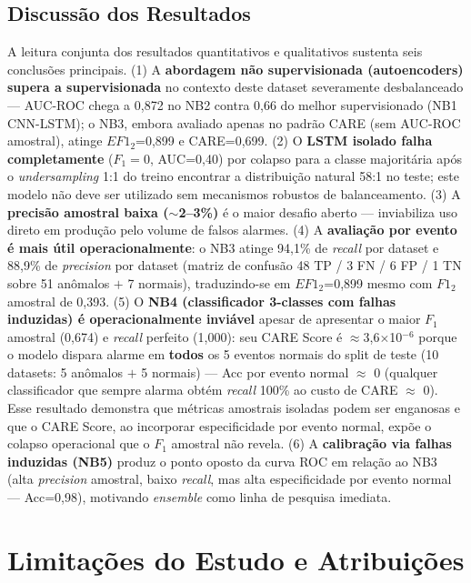 \documentclass[12pt]{article}
\begin{document}
\subsection{Discussão dos Resultados}

A leitura conjunta dos resultados quantitativos e qualitativos sustenta seis conclusões principais. (1) A \textbf{abordagem não supervisionada (autoencoders) supera a supervisionada} no contexto deste dataset severamente desbalanceado --- AUC-ROC chega a 0,872 no NB2 contra 0,66 do melhor supervisionado (NB1 CNN-LSTM); o NB3, embora avaliado apenas no padrão CARE (sem AUC-ROC amostral), atinge $EF1_2$=0,899 e CARE=0,699. (2) O \textbf{LSTM isolado falha completamente} ($F_1=0$, AUC=0,40) por colapso para a classe majoritária após o \textit{undersampling} 1:1 do treino encontrar a distribuição natural 58:1 no teste; este modelo não deve ser utilizado sem mecanismos robustos de balanceamento. (3) A \textbf{precisão amostral baixa ($\sim$2--3\%)} é o maior desafio aberto --- inviabiliza uso direto em produção pelo volume de falsos alarmes. (4) A \textbf{avaliação por evento é mais útil operacionalmente}: o NB3 atinge 94,1\% de \textit{recall} por dataset e 88,9\% de \textit{precision} por dataset (matriz de confusão 48 TP / 3 FN / 6 FP / 1 TN sobre 51 anômalos $+$ 7 normais), traduzindo-se em $EF1_2$=0,899 mesmo com $F1_2$ amostral de 0,393. (5) O \textbf{NB4 (classificador 3-classes com falhas induzidas) é operacionalmente inviável} apesar de apresentar o maior $F_1$ amostral (0,674) e \textit{recall} perfeito (1,000): seu CARE Score é $\approx$3,6$\times$10$^{-6}$ porque o modelo dispara alarme em \textbf{todos} os 5 eventos normais do split de teste (10 datasets: 5 anômalos $+$ 5 normais) --- Acc por evento normal $\approx$ 0 (qualquer classificador que sempre alarma obtém \textit{recall} 100\% ao custo de CARE $\approx$ 0). Esse resultado demonstra que métricas amostrais isoladas podem ser enganosas e que o CARE Score, ao incorporar especificidade por evento normal, expõe o colapso operacional que o $F_1$ amostral não revela. (6) A \textbf{calibração via falhas induzidas (NB5)} produz o ponto oposto da curva ROC em relação ao NB3 (alta \textit{precision} amostral, baixo \textit{recall}, mas alta especificidade por evento normal --- Acc=0,98), motivando \textit{ensemble} como linha de pesquisa imediata.

\section{Limitações do Estudo e Atribuições}\label{sec:limitacoes}
\end{document}
